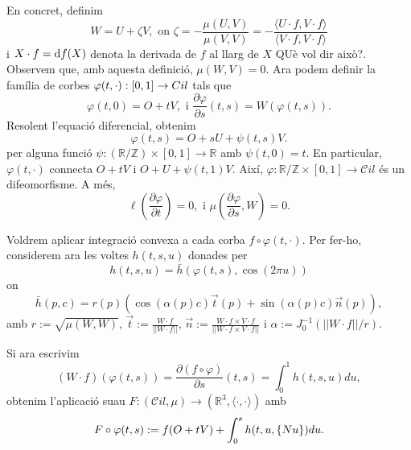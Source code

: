 En concret, definim 
\begin{equation}
    W=U+\zeta V, \text{ on } \zeta = -\frac{\mu(U,V)}{\mu(V,V)} = -\frac{\langle U\cdot f, V\cdot f\rangle}{\langle V\cdot f, V\cdot f\rangle}
\end{equation}
i $X\cdot f = \text df(X)$ denota la derivada de $f$ al llarg de $X${\color{blue} QUè vol dir això?}. Observem que, amb aquesta definició, $\mu(W,V)=0$. Ara podem definir la família de corbes $\varphi(t,\cdot):[0,1]\to\mathbb \mathcal Cil$ tals que 
\begin{equation}
    \varphi(t,0) = O + tV, \text{ i } \frac{\partial\varphi}{\partial s}(t,s) = W(\varphi(t,s)).
\end{equation}
Resolent l'equació diferencial, obtenim
\begin{equation}
    \varphi(t,s) = O + sU + \psi(t,s)V.
\end{equation}
per alguna funció $\psi:(\mathbb R/\mathbb Z)\times[0,1]\to\mathbb R$ amb $\psi(t,0)=t$. En particular, $\varphi(t,\cdot)$ connecta $O+tV$ i $O+U+\psi(t,1)V$. Així, $\varphi:\mathbb R/\mathbb Z\times[0,1]\to\mathcal Cil$ és un difeomorfisme. A més, 
\begin{equation}
    \ell\left( \frac{\partial\varphi}{\partial t} \right) = 0, \text{ i } \mu\left( \frac{\partial\varphi}{\partial s}, W \right) = 0.
\end{equation}

Voldrem aplicar integració convexa a cada corba $f\circ\varphi(t,\cdot)$. Per fer-ho, considerem ara les voltes $h(t,s,u)$ donades per
\begin{equation}
    h(t,s,u) = \bar h(\varphi(t,s), \cos(2\pi u))
\end{equation}
on 
\begin{equation*}
    \bar h(p, c) = r(p)\left( \cos(\alpha(p)c)\vec t(p) + \sin(\alpha(p)c)\vec n(p) \right),
\end{equation*}
amb $r:=\sqrt{\mu(W,W)}$, $\vec t := \frac{W\cdot f}{||W\cdot f||}$, $\vec n := \frac{W\cdot f\times V\cdot f}{||W\cdot f\times V\cdot f||}$ i $\alpha:= J_0^{-1}(||W\cdot f||/r)$.

Si ara escrivim 
\begin{equation*}
    (W\cdot f)(\varphi(t,s)) = \frac{\partial(f\circ\varphi)}{\partial s}(t,s)= \int_0^1 h(t,s,u) du,
\end{equation*}
obtenim l'aplicació suau $F:(\mathcal Cil, \mu)\to(\mathbb R^3, \langle\cdot, \cdot\rangle)$ amb
\begin{equation}
    F\circ\varphi(t,s) := f(O+tV) + \int_0^s h(t,u,\{Nu\}) du.
\end{equation}

